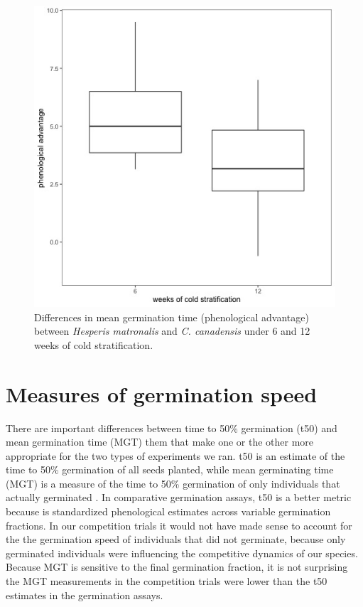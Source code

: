 \documentclass{article}
\begin{document}
\begin{figure}[hp]
    \centering
\includegraphics[width=.7\textwidth]{..//figure/priority_treat.jpeg}
   \caption{Differences in mean germination time (phenological advantage) between \textit{Hesperis matronalis} and \textit{C. canadensis} under 6 and 12 weeks of cold stratification.} 
   \label{fig:MGTsup}
\end{figure}

\pagebreak
\section*{Measures of germination speed}
There are important differences between time to 50\% germination (t50) and mean germination time (MGT) them that make one or the other more appropriate for the two types of experiments we ran. t50 is an estimate of the time to 50\% germination of all seeds planted, while mean germinating time (MGT) is a measure of the time to 50\% germination of only individuals that actually germinated \citep{Soltani:2015aa}. In comparative germination assays, t50 is a better metric because is standardized phenological estimates across variable germination fractions. In our competition trials it would not have made sense to account for the the germination speed of individuals that did not germinate, because only germinated individuals were influencing the competitive dynamics of our species. Because MGT is sensitive to the final germination fraction, it is not surprising the MGT measurements in the competition trials  were lower than the t50 estimates in the germination assays.


\end{document}
